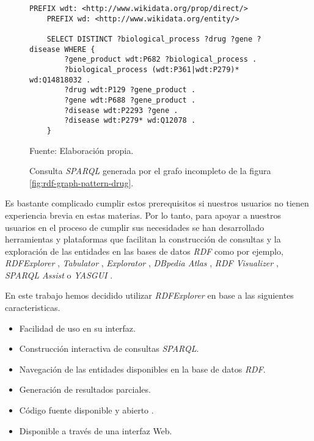 \begin{figure}[ht]
    \begin{lstlisting}[language=SPARQL]
    PREFIX wdt: <http://www.wikidata.org/prop/direct/>
    PREFIX wd: <http://www.wikidata.org/entity/>
        
    SELECT DISTINCT ?biological_process ?drug ?gene ?disease WHERE {
        ?gene_product wdt:P682 ?biological_process .
        ?biological_process (wdt:P361|wdt:P279)* wd:Q14818032 .
        ?drug wdt:P129 ?gene_product .
        ?gene wdt:P688 ?gene_product .
        ?disease wdt:P2293 ?gene .
        ?disease wdt:P279* wd:Q12078 .
    }
    \end{lstlisting}
    \caption{Consulta \textit{SPARQL} generada por el grafo incompleto de la figura \ref{fig:rdf-graph-pattern-drug}.} Fuente: Elaboración propia.
    \label{code:sparql-query-drug}
\end{figure}

Es bastante complicado cumplir estos prerequisitos si nuestros usuarios no tienen experiencia brevia en estas materias. Por lo tanto, para apoyar a nuestros usuarios en el proceso de cumplir sus necesidades se han desarrollado herramientas y plataformas que facilitan la construcción de consultas y la exploración de las entidades en las bases de datos \textit{RDF} como por ejemplo, \textit{RDFExplorer} \cite{vargas2019rdf}, \textit{Tabulator} \cite{berners2006tabulator} , \textit{Explorator} \cite{araujo2009experimenting}, \textit{DBpedia Atlas} \cite{valsecchi2015dbpedia}, \textit{RDF Visualizer} \cite{sayers2004node}, \textit{SPARQL Assist} \cite{mccarthy2012sparql} o \textit{YASGUI} \cite{rietveld2017yasgui}.

En este trabajo hemos decidido utilizar \textit{RDFExplorer} en base a las siguientes caracteristicas.

\begin{itemize}
    \item Facilidad de uso en su interfaz.
    \item Construcción interactiva de consultas \textit{SPARQL}.
    \item Navegación de las entidades disponibles en la base de datos \textit{RDF}.
    \item Generación de resultados parciales.
    \item Código fuente disponible y abierto \cite{vargas2019rdfrepo}.
    \item Disponible a través de una interfaz Web.
\end{itemize}


